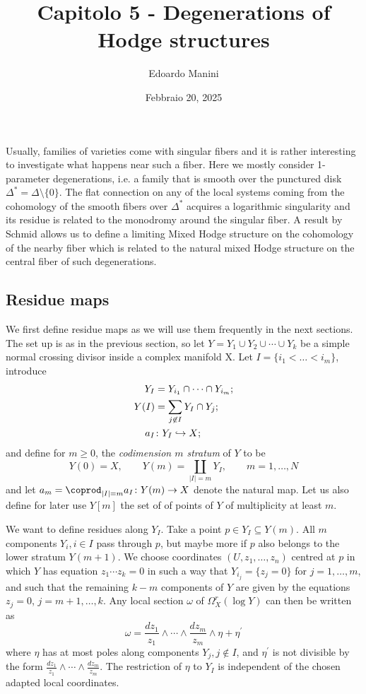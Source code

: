\documentclass[../main.tex]{subfiles}
\title{Capitolo 5 - Degenerations of Hodge structures}
\author{Edoardo Manini}
\date{Febbraio 20, 2025}
\begin{document}
\ifSubfilesClassLoaded{
\maketitle
\tableofcontents
}{}



Usually, families of varieties come with singular fibers and it is rather interesting to investigate what happens near such a fiber. Here we mostly consider 1-parameter degenerations, i.e. a family that is smooth over the punctured disk $\Delta^* = \Delta \setminus \{0\} $. The flat connection on any of the local systems coming from the cohomology of the smooth fibers over $\Delta^*$ acquires a logarithmic singularity
and its residue is related to the monodromy around the singular fiber.
A result by Schmid allows us to define a limiting Mixed Hodge structure on the cohomology of the nearby fiber which is related to the natural mixed Hodge structure on the central fiber of such degenerations.

\subsection{Residue maps}
We first define residue maps as we will use them frequently in the next sections.
The set up is as in the previous section, so let $Y= Y_1 \cup Y_2 \cup \cdots \cup Y_k$ be a simple normal crossing divisor inside a complex manifold X. Let $I = \{ i_1< \dots <i_m\}$, introduce
\begin{align*}
    Y_I &= Y_{i_1} \cap \cdots \cap Y_{i_{m}}; \\
    Y(I) &= \sum_{j \not\in I} Y_I \cap Y_j; \\
     a_I &\colon Y_I \hookrightarrow X ;
\end{align*}
and define for $m \geq 0$, the \emph{codimension $m$ stratum} of $Y$ to be
\[
Y(0)=X, \qquad Y(m) = \coprod_{|I|=m}  Y_I, \qquad m=1,\dots,N 
\]
and let $a_m= \coprod_{|I|=m} a_I \colon Y(m) \ra X$ denote the natural map. Let us also define for later use $Y[m]$ the set of of points of $Y$ of multiplicity at least $m$.


We want to define residues along $Y_I$. Take a point $p \in Y_I \subseteq Y(m)$. All $m$ components $Y_i, i\in I$ pass through $p$, but maybe more if $p$ also belongs to the lower stratum $Y(m+1)$. We choose coordinates $(U,z_1,\dots ,z_n)$ centred at $p$ in which $Y$ has equation $z_1 \cdots z_k =0$ in such a way that $Y_{i_j} = \{ z_j = 0 \} $ for $j = 1,\dots ,m$, and such that the remaining $k - m$ components of $Y$ are given by the equations ${z_j = 0}$, $j = m + 1,\dots ,k$. Any local section $\omega$ of $\Omega^r_X(\log Y)$ can then be written as 
\[
\omega = \frac{dz_1}{z_1} \wedge \cdots \wedge\frac{dz_m}{z_m} \wedge \eta + \eta^\prime
\]
where $\eta$ has at most poles along components $Y_j , j \not\in I$, and $\eta^\prime$ is not divisible by the form $\frac{dz_1}{z_1}\wedge \cdots \wedge\frac{dz_m}{z_m} $. The restriction of $\eta$ to $Y_I$ is independent of the chosen adapted local coordinates. 
\end{document}
